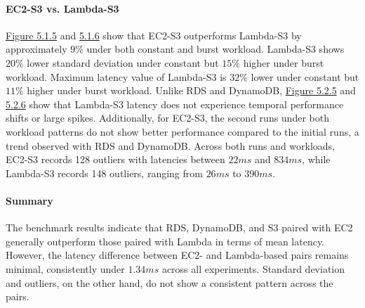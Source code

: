 \paragraph*{EC2-S3 vs. Lambda-S3}
\hyperref[fig:bar_s3_const]{Figure 5.1.5} and \hyperref[fig:bar_s3_bursty]{5.1.6} show that EC2-S3 outperforms Lambda-S3 by approximately $9\%$ under both constant and burst workload. Lambda-S3 shows $20\%$ lower standard deviation under constant but $15\%$ higher under burst workload. Maximum latency value of Lambda-S3 is $32\%$ lower under constant but $11\%$ higher under burst workload.
%
Unlike RDS and DynamoDB, \hyperref[fig:ts_s3_const]{Figure 5.2.5} and \hyperref[fig:ts_s3_bursty]{5.2.6} show that Lambda-S3 latency does not experience temporal performance shifts or large spikes. Additionally, for EC2-S3, the second runs under both workload patterns do not show better performance compared to the initial runs, a trend observed with RDS and DynamoDB.
%
Across both runs and workloads, EC2-S3 records 128 outliers with latencies between $22ms$ and $834ms$, while Lambda-S3 records 148 outliers, ranging from $26ms$ to $390ms$.

\paragraph*{Summary}
The benchmark results indicate that RDS, DynamoDB, and S3 paired with EC2 generally outperform those paired with Lambda in terms of mean latency. However, the latency difference between EC2- and Lambda-based pairs remains minimal, consistently under $1.34ms$ across all experiments. Standard deviation and outliers, on the other hand, do not show a consistent pattern across the pairs. 

